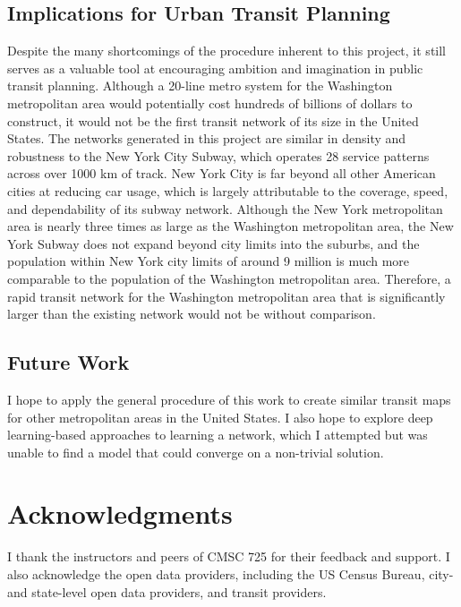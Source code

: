 \documentclass[sigconf,nonacm]{acmart}
\begin{document}
\subsection{Implications for Urban Transit Planning}
Despite the many shortcomings of the procedure inherent to this project, it still serves as a valuable tool at encouraging ambition and imagination in public transit planning. Although a 20-line metro system for the Washington metropolitan area would potentially cost hundreds of billions of dollars to construct, it would not be the first transit network of its size in the United States. The networks generated in this project are similar in density and robustness to the New York City Subway, which operates 28 service patterns across over 1000 km of track. New York City is far beyond all other American cities at reducing car usage, which is largely attributable to the coverage, speed, and dependability of its subway network. Although the New York metropolitan area is nearly three times as large as the Washington metropolitan area, the New York Subway does not expand beyond city limits into the suburbs, and the population within New York city limits of around 9 million is much more comparable to the population of the Washington metropolitan area. Therefore, a rapid transit network for the Washington metropolitan area that is significantly larger than the existing network would not be without comparison. 

\subsection{Future Work}

I hope to apply the general procedure of this work to create similar transit maps for other metropolitan areas in the United States. I also hope to explore deep learning-based approaches to learning a network, which I attempted but was unable to find a model that could converge on a non-trivial solution. 

\section{Acknowledgments}

I thank the instructors and peers of CMSC 725 for their feedback and support. I also acknowledge the open data providers, including the US Census Bureau, city- and state-level open data providers, and transit providers.



\end{document}
